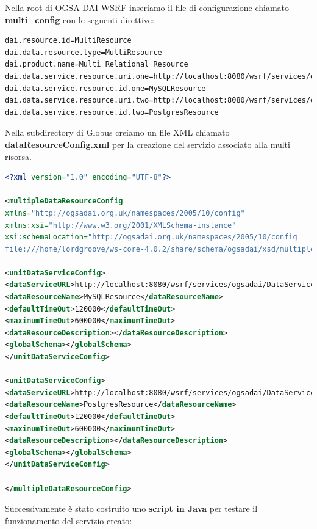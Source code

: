 \documentclass[11pt]{article}
\begin{document}
Nella root di OGSA-DAI WSRF inseriamo il file di configurazione chiamato \textbf{multi\_config} con le seguenti direttive: 

\begin{lstlisting}[language=bash]
dai.resource.id=MultiResource
dai.data.resource.type=MultiResource
dai.product.name=Multi Relational Resource
dai.data.service.resource.uri.one=http://localhost:8080/wsrf/services/ogsadai/DataService
dai.data.service.resource.id.one=MySQLResource
dai.data.service.resource.uri.two=http://localhost:8080/wsrf/services/ogsadai/DataService2
dai.data.service.resource.id.two=PostgresResource
\end{lstlisting}

Nella subdirectory di Globus  creiamo un file XML chiamato \textbf{dataResourceConfig.xml} per la creazione del servizio associato alla multi risorsa. 

\begin{lstlisting}[language=xml]
<?xml version="1.0" encoding="UTF-8"?>

<multipleDataResourceConfig
xmlns="http://ogsadai.org.uk/namespaces/2005/10/config" 
xmlns:xsi="http://www.w3.org/2001/XMLSchema-instance"
xsi:schemaLocation="http://ogsadai.org.uk/namespaces/2005/10/config
file:///home/lordgroove/ws-core-4.0.2/share/schema/ogsadai/xsd/multiple_data_resource_config.xsd">

<unitDataServiceConfig>
<dataServiceURL>http://localhost:8080/wsrf/services/ogsadai/DataService</dataServiceURL>
<dataResourceName>MySQLResource</dataResourceName>
<defaultTimeOut>120000</defaultTimeOut>
<maximumTimeOut>600000</maximumTimeOut>
<dataResourceDescription></dataResourceDescription>
<globalSchema></globalSchema>
</unitDataServiceConfig>

<unitDataServiceConfig>
<dataServiceURL>http://localhost:8080/wsrf/services/ogsadai/DataService2</dataServiceURL>
<dataResourceName>PostgresResource</dataResourceName>
<defaultTimeOut>120000</defaultTimeOut>
<maximumTimeOut>600000</maximumTimeOut>
<dataResourceDescription></dataResourceDescription>
<globalSchema></globalSchema>
</unitDataServiceConfig>

</multipleDataResourceConfig>

\end{lstlisting}

Successivamente è stato costruito uno \textbf{script in Java} per testare il funzionamento del servizio creato:
\end{document}
